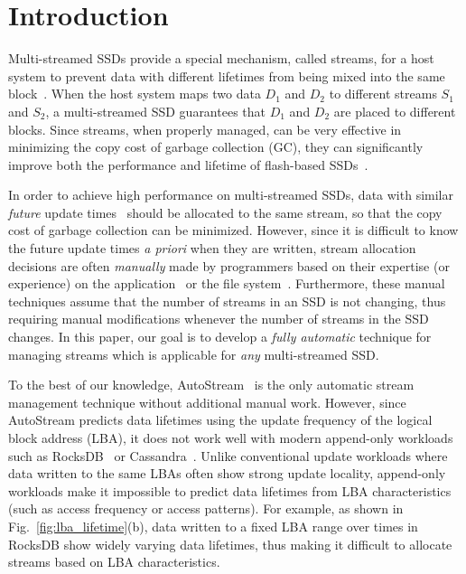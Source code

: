 \section{Introduction}
\label{sec:intro}
Multi-streamed SSDs provide a special mechanism,
called streams, for a host system to prevent data with different lifetimes 
from being mixed into the same block~\cite{T10, MultiStream}.
When the host system maps two data $D_1$ and $D_2$ to 
different streams $S_1$ and $S_2$, a multi-streamed SSD guarantees that 
$D_1$ and $D_2$ are placed to different blocks.   
Since streams, when properly managed, can be very effective in minimizing 
the copy cost of garbage collection (GC), they
can significantly improve both the performance and lifetime of 
flash-based SSDs~\cite{MultiStream, FStream, AutoStream, Level}.

In order to achieve high performance on multi-streamed SSDs, data with similar 
{\it future} update times~\cite{PCHa}
should be allocated 
to the same stream, so that the copy cost of garbage collection can be minimized.
However, since it is difficult to know the future update times {\it a priori} when they are written,
stream allocation decisions are often {\it manually} made by programmers based on their expertise (or experience) 
on the application~\cite{MultiStream} or the file system~\cite{FStream}.  
Furthermore, these manual techniques assume 
that the number of streams in an SSD is not changing, 
thus requiring manual modifications whenever the number of streams in the SSD changes.
In this paper, our goal is to develop 
a {\it fully automatic} technique for managing streams 
which is applicable for {\it any} multi-streamed SSD.

To the best of our knowledge, AutoStream~\cite{AutoStream} is the only automatic 
stream management technique
without additional manual work.  
However, since AutoStream predicts data lifetimes using the update frequency 
of the logical block address (LBA), it does not work well with modern append-only workloads 
such as RocksDB~\cite{RocksDB} or Cassandra~\cite{Cassandra}.  
Unlike conventional update workloads where data written to the same LBAs 
often show strong update locality, 
append-only workloads make it impossible to predict data lifetimes 
from LBA characteristics (such as access frequency or access patterns).  
For example, as shown in Fig.~\ref{fig:lba_lifetime}(b), 
data written to a fixed LBA range over times in RocksDB 
show widely varying data lifetimes, 
thus making it difficult to allocate streams based on LBA characteristics.

